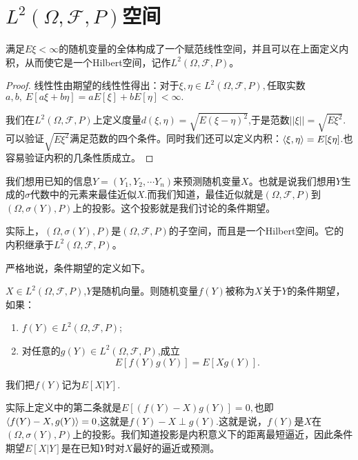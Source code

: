 \documentclass[lang=cn,10pt]{elegantbook}
\begin{document}
	\section{\(L^2(\Omega,\mathcal{F},P)\)空间}
	\begin{definition}
		满足\(E\xi<\infty\)的随机变量的全体构成了一个赋范线性空间，并且可以在上面定义内积，从而使它是一个Hilbert空间，记作\(L^2(\Omega,\mathcal{F},P)\)。
	\end{definition}
	\begin{proof}
		线性性由期望的线性性得出：对于\(\xi,\eta\in L^2(\Omega,\mathcal{F},P),\)任取实数\(a,b,\ E[a\xi +b\eta]=aE[\xi]+bE[\eta]<\infty.\)
		
		我们在\(L^2(\Omega,\mathcal{F},P)\)上定义度量\(d(\xi,\eta)=\sqrt{E(\xi-\eta)^2}\),于是范数\(||\xi||=\sqrt{E\xi^2}\).可以验证\(\sqrt{E\xi^2}\)满足范数的四个条件。同时我们还可以定义内积：\(\Braket{\xi,\eta}=E[\xi\eta]\).也容易验证内积的几条性质成立。
	\end{proof}
	我们想用已知的信息\(Y=(Y_1,Y_2,\cdots Y_n)\)来预测随机变量\(X\)。也就是说我们想用\(Y\)生成的\(\sigma\)代数中的元素来最佳近似\(X\).而我们知道，最佳近似就是\((\Omega,\mathcal{F},P)\)到\((\Omega,\sigma(Y),P)\)上的投影。这个投影就是我们讨论的条件期望。
	
	实际上，\((\Omega,\sigma(Y),P)\)是\((\Omega,\mathcal{F},P)\)的子空间，而且是一个Hilbert空间。它的内积继承于\(L^2(\Omega,\mathcal{F},P)\)。
	
	严格地说，条件期望的定义如下。
	\begin{definition}[条件期望]
		\(X\in L^2(\Omega,\mathcal{F},P)\),\(Y\)是随机向量。则随机变量\(f(Y)\)被称为\(X\)关于\(Y\)的条件期望，如果：
		\begin{enumerate}
			\item \(f(Y)\in L^2(\Omega,\mathcal{F},P)\);
			\item 对任意的\(g(Y)\in L^2(\Omega,\mathcal{F},P)\),成立
			\[E[f(Y)g(Y)]=E[Xg(Y)].\]
			
		\end{enumerate}
		我们把\(f(Y)\)记为\(E[X|Y]\).
	\end{definition}
	\begin{note}
		实际上定义中的第二条就是\(E[(f(Y)-X)g(Y)]=0,\)也即\(\Braket{f(Y)-X,g(Y)}=0\),这就是\(f(Y)-X\perp g(Y)\).这就是说，\(f(Y)\)是\(X\)在\((\Omega,\sigma(Y),P)\)上的投影。我们知道投影是内积意义下的距离最短逼近，因此条件期望\(E[X|Y]\)是在已知\(Y\)时对\(X\)最好的逼近或预测。
	\end{note}
	
\end{document}
